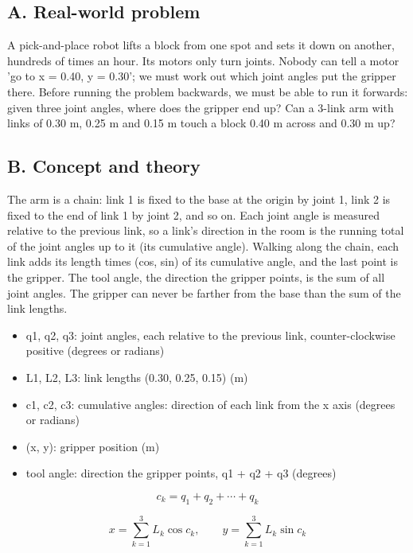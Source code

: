 \documentclass[11pt,a4paper]{article}
\begin{document}
\subsection*{A. Real-world problem}
A pick-and-place robot lifts a block from one spot and sets it down on another, hundreds of times an hour. Its motors only turn joints. Nobody can tell a motor 'go to x = 0.40, y = 0.30'; we must work out which joint angles put the gripper there. Before running the problem backwards, we must be able to run it forwards: given three joint angles, where does the gripper end up? Can a 3-link arm with links of 0.30 m, 0.25 m and 0.15 m touch a block 0.40 m across and 0.30 m up?

\subsection*{B. Concept and theory}
The arm is a chain: link 1 is fixed to the base at the origin by joint 1, link 2 is fixed to the end of link 1 by joint 2, and so on. Each joint angle is measured relative to the previous link, so a link's direction in the room is the running total of the joint angles up to it (its cumulative angle). Walking along the chain, each link adds its length times (cos, sin) of its cumulative angle, and the last point is the gripper. The tool angle, the direction the gripper points, is the sum of all joint angles. The gripper can never be farther from the base than the sum of the link lengths.

\begin{itemize}[nosep]
\item q1, q2, q3: joint angles, each relative to the previous link, counter-clockwise positive (degrees or radians)
\item L1, L2, L3: link lengths (0.30, 0.25, 0.15) (m)
\item c1, c2, c3: cumulative angles: direction of each link from the x axis (degrees or radians)
\item (x, y): gripper position (m)
\item tool angle: direction the gripper points, q1 + q2 + q3 (degrees)
\end{itemize}

\begin{equation*}
c_k=q_1+q_2+\cdots+q_k
\end{equation*}

\begin{equation*}
x=\sum_{k=1}^{3}L_k\cos c_k,\qquad y=\sum_{k=1}^{3}L_k\sin c_k
\end{equation*}
\end{document}
